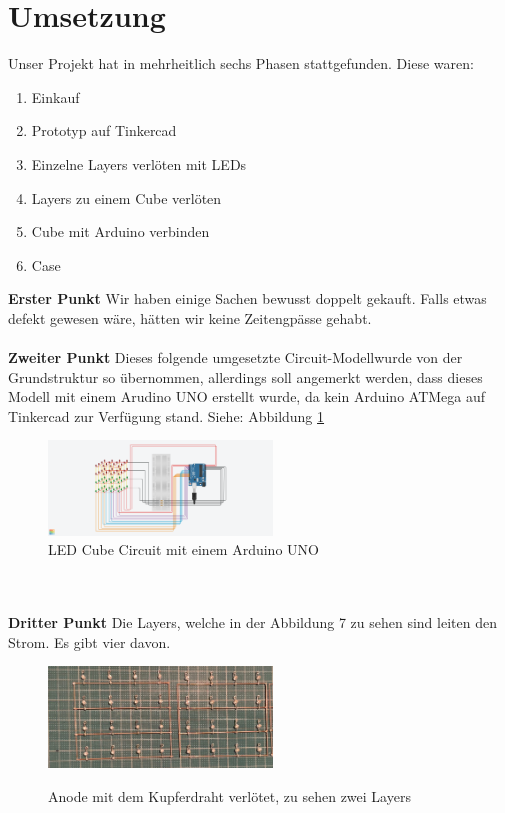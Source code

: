 \documentclass{article}
\begin{document}
\section{Umsetzung}
Unser Projekt hat in mehrheitlich sechs Phasen stattgefunden. Diese waren:
\begin{enumerate}[label=(\roman*)]
\item Einkauf
\item Prototyp auf Tinkercad
\item Einzelne Layers verlöten mit LEDs
\item Layers zu einem Cube verlöten
\item Cube mit Arduino verbinden
\item Case
\end{enumerate}
\textbf{Erster Punkt} Wir haben einige Sachen bewusst doppelt gekauft. Falls etwas defekt gewesen wäre, hätten wir keine Zeitengpässe gehabt. \\ \\ 
\textbf{Zweiter Punkt} Dieses folgende umgesetzte \glqq Circuit-Modell\grqq \text{ }wurde von der Grundstruktur so übernommen, allerdings soll angemerkt werden, dass dieses Modell mit einem Arudino UNO erstellt wurde, da kein Arduino ATMega auf Tinkercad zur Verfügung stand. Siehe: Abbildung \ref{fig:tinkercad}
\begin{figure}[h!]
\begin{center}
\includegraphics[width=0.53\textwidth]{bilder/ledcube.png}
\caption{LED Cube Circuit mit einem Arduino UNO}
\label{fig:tinkercad}
\end{center}
\end{figure}
\\ \\
\textbf{Dritter Punkt} Die Layers, welche in der Abbildung 7 zu sehen sind leiten den Strom. Es gibt vier davon. 
\begin{figure}[!h]
\begin{center}
\includegraphics[width=0.53\textwidth]{bilder/layers.jpeg}
\label{fig:anode}
\caption{Anode mit dem Kupferdraht verlötet, zu sehen zwei Layers}
\end{center}
\end{figure}
\end{document}
